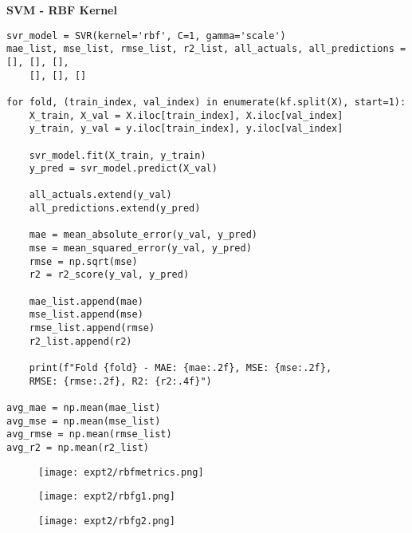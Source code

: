\documentclass[11pt]{article}
\begin{document}
\textbf{SVM - RBF Kernel}
\begin{verbatim}
svr_model = SVR(kernel='rbf', C=1, gamma='scale')
mae_list, mse_list, rmse_list, r2_list, all_actuals, all_predictions = [], [], [], 
    [], [], []

for fold, (train_index, val_index) in enumerate(kf.split(X), start=1):
    X_train, X_val = X.iloc[train_index], X.iloc[val_index]
    y_train, y_val = y.iloc[train_index], y.iloc[val_index]
    
    svr_model.fit(X_train, y_train)
    y_pred = svr_model.predict(X_val)

    all_actuals.extend(y_val)
    all_predictions.extend(y_pred)

    mae = mean_absolute_error(y_val, y_pred)
    mse = mean_squared_error(y_val, y_pred)
    rmse = np.sqrt(mse)
    r2 = r2_score(y_val, y_pred)

    mae_list.append(mae)
    mse_list.append(mse)
    rmse_list.append(rmse)
    r2_list.append(r2)

    print(f"Fold {fold} - MAE: {mae:.2f}, MSE: {mse:.2f}, 
    RMSE: {rmse:.2f}, R2: {r2:.4f}")

avg_mae = np.mean(mae_list)
avg_mse = np.mean(mse_list)
avg_rmse = np.mean(rmse_list)
avg_r2 = np.mean(r2_list)

\end{verbatim}

\begin{figure}[H]
\centering
\texttt{[image: expt2/rbfmetrics.png]} 
\end{figure}

\begin{figure}[H]
\centering
\texttt{[image: expt2/rbfg1.png]} 
\end{figure}

\begin{figure}[H]
\centering
\texttt{[image: expt2/rbfg2.png]} 
\end{figure}
\end{document}
